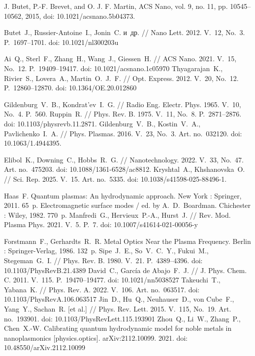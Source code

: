 \documentclass[12pt, a4paper]{article}
\begin{document}
\begin{thebibliography}{99}
J. Butet, P.-F. Brevet, and O. J. F. Martin, {ACS Nano}, vol. 9, no. 11, pp. 10545–10562, 2015, doi: 10.1021/acsnano.5b04373.

Butet~J., Russier-Antoine~I., Jonin~C. и~др. // Nano Lett. 2012. V.~12, No.~3. P.~1697--1701. doi: 10.1021/nl300203u

Ai~Q., Sterl~F., Zhang~H., Wang~J., Giessen~H. // ACS Nano. 2021. V.~15, No.~12. P.~19409--19417. doi: 10.1021/acsnano.1c05970
Thyagarajan~K., Rivier~S., Lovera~A., Martin~O.~J.~F. // Opt. Express. 2012. V.~20, No.~12. P.~12860--12870. doi: 10.1364/OE.20.012860

Gildenburg~V.~B., Kondrat’ev~I.~G. // Radio Eng. Electr. Phys. 1965. V.~10, No.~4. P.~560.
Ruppin~R. // Phys. Rev. B. 1975. V.~11, No.~8. P.~2871--2876. doi: 10.1103/physrevb.11.2871.
Gildenburg~V.~B., Kostin~V.~A., Pavlichenko~I.~A. // Phys. Plasmas. 2016. V.~23, No.~3. Art. no.~032120. doi: 10.1063/1.4944395.





Elibol~K., Downing~C., Hobbs~R.~G. // Nanotechnology. 2022. V.~33, No.~47. Art. no.~475203. doi: 10.1088/1361-6528/ac8812.
Kryshtal~A., Khshanovska~O. // Sci. Rep. 2025. V.~15. Art. no.~5335. doi: 10.1038/s41598-025-88496-1.

Haas~F. Quantum plasmas: An hydrodynamic approach. New York : Springer, 2011. 65~p.
Electromagnetic surface modes / ed. by A.~D.~Boardman. Chichester : Wiley, 1982. 770~p.
Manfredi~G., Hervieux~P.-A., Hurst~J. // Rev. Mod. Plasma Phys. 2021. V.~5. P.~7. 
doi: 10.1007/s41614-021-00056-y


Forstmann~F., Gerhardts~R.~R. Metal Optics Near the Plasma Frequency. Berlin : Springer-Verlag, 1986. 132~p.
Sipe~J.~E., So~V.~C.~Y., Fukui~M., Stegeman~G.~I. // Phys. Rev. B. 1980. V.~21. P.~4389--4396. doi: 10.1103/PhysRevB.21.4389
David~C., Garc\'{i}a de Abajo~F.~J. // J. Phys. Chem. C. 2011. V.~115. P.~19470--19477. doi: 10.1021/nn5038527
Takeuchi~T., Yabana~K. // Phys. Rev. A. 2022. V.~106. Art. no.~063517. doi: 10.1103/PhysRevA.106.063517
Jin~D., Hu~Q., Neuhauser~D., von Cube~F., Yang~Y., Sachan~R. [et al.] // Phys. Rev. Lett. 2015. V.~115, No.~19. Art. no.~193901. doi: 10.1103/PhysRevLett.115.193901
Zhou~Q., Li~W., Zhang~P., Chen~X.-W. Calibrating quantum hydrodynamic model for noble metals in nanoplasmonics [physics.optics]. arXiv:2112.10099. 2021. doi: 10.48550/arXiv.2112.10099


\end{thebibliography}
\end{document}
